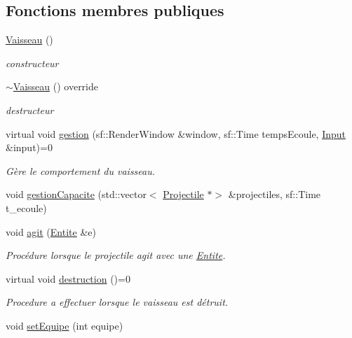 \subsection*{Fonctions membres publiques}
\begin{DoxyCompactItemize}
\item 
\hyperlink{class_vaisseau_a86378a70f0d92fcc6c5c5973574b2b7d}{Vaisseau} ()
\begin{DoxyCompactList}\small\item\em constructeur \end{DoxyCompactList}\item 
\hyperlink{class_vaisseau_a3360bd62af7a7aaf5732b86d639a0674}{$\sim$\+Vaisseau} () override
\begin{DoxyCompactList}\small\item\em destructeur \end{DoxyCompactList}\item 
virtual void \hyperlink{class_vaisseau_afaa179c1f03255d7869b8e2296ed8307}{gestion} (sf\+::\+Render\+Window \&window, sf\+::\+Time temps\+Ecoule, \hyperlink{_input_8h_a5588d60d674991c719a8df848313e966}{Input} \&input)=0
\begin{DoxyCompactList}\small\item\em Gère le comportement du vaisseau. \end{DoxyCompactList}\item 
void \hyperlink{class_vaisseau_a21fbd13a4fad50af3ae34a36dbcb6820}{gestion\+Capacite} (std\+::vector$<$ \hyperlink{class_projectile}{Projectile} $\ast$$>$ \&projectiles, sf\+::\+Time t\+\_\+ecoule)
\item 
void \hyperlink{class_vaisseau_a0cd6733845f221c2a5a9d7ccd7f43137}{agit} (\hyperlink{class_entite}{Entite} \&e)
\begin{DoxyCompactList}\small\item\em Procédure lorsque le projectile agit avec une \hyperlink{class_entite}{Entite}. \end{DoxyCompactList}\item 
virtual void \hyperlink{class_vaisseau_af4f490c5fd9e171b23067ec73aa737ad}{destruction} ()=0
\begin{DoxyCompactList}\small\item\em Procedure a effectuer lorsque le vaisseau est détruit. \end{DoxyCompactList}\item 
void \hyperlink{class_vaisseau_a1b3edda1f99d55cb5c0c7cbafe156af6}{set\+Equipe} (int equipe)
\item 
$$
\end{DoxyCompactItemize}
